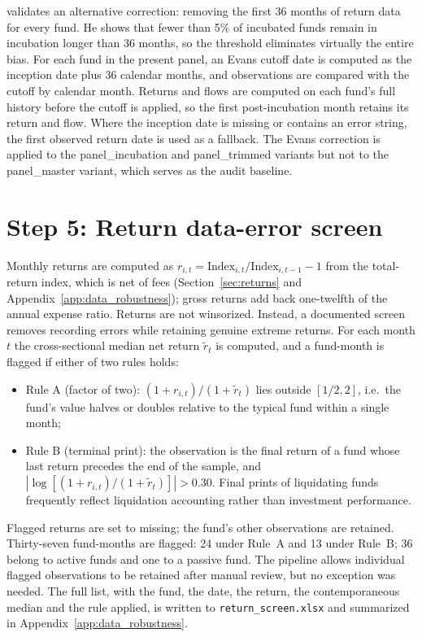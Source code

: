 \documentclass[12pt, oneside]{report}
\begin{document}
\textcite{Evans2010} validates an alternative correction: removing the
first 36 months of return data for every fund. He shows that fewer
than 5\% of incubated funds remain in incubation longer than 36
months, so the threshold eliminates virtually the entire bias. For
each fund in the present panel, an Evans cutoff date is computed as
the inception date plus 36 calendar months, and observations are
compared with the cutoff by calendar month. Returns and flows are
computed on each fund's full history before the cutoff is applied, so
the first post-incubation month retains its return and flow. Where the inception date
is missing or contains an error string, the first observed return
date is used as a fallback. The Evans correction is applied to the
panel\_incubation and panel\_trimmed variants but
not to the panel\_master variant, which serves as the
audit baseline.

\section{Step 5: Return data-error screen}
\label{sec:winsorization}

\noindent Monthly returns are computed as
$r_{i,t} = \text{Index}_{i,t} / \text{Index}_{i,t-1} - 1$ from the
total-return index, which is net of fees (Section~\ref{sec:returns} and
Appendix~\ref{app:data_robustness}); gross returns add back one-twelfth of the annual expense
ratio. Returns are not winsorized. Instead, a documented screen removes
recording errors while retaining genuine extreme returns. For each month
$t$ the cross-sectional median net return $\tilde{r}_t$ is computed, and
a fund-month is flagged if either of two rules holds:
\begin{itemize}
\item Rule A (factor of two): $(1 + r_{i,t}) / (1 + \tilde{r}_t)$ lies
outside $[1/2, 2]$, i.e.\ the fund's value halves or doubles relative to
the typical fund within a single month;
\item Rule B (terminal print): the observation is the final return of a
fund whose last return precedes the end of the sample, and
$|\log[(1 + r_{i,t}) / (1 + \tilde{r}_t)]| > 0.30$. Final prints of
liquidating funds frequently reflect liquidation accounting rather than
investment performance.
\end{itemize}
Flagged returns are set to missing; the fund's other observations are
retained. Thirty-seven fund-months are flagged: 24 under Rule~A and 13
under Rule~B; 36 belong to active funds and one to a passive fund. The pipeline allows individual flagged
observations to be retained after manual review, but no exception was
needed. The full list, with the fund, the date, the
return, the contemporaneous median and the rule applied, is written to
\texttt{return\_screen.xlsx} and summarized in Appendix~\ref{app:data_robustness}.
\end{document}
